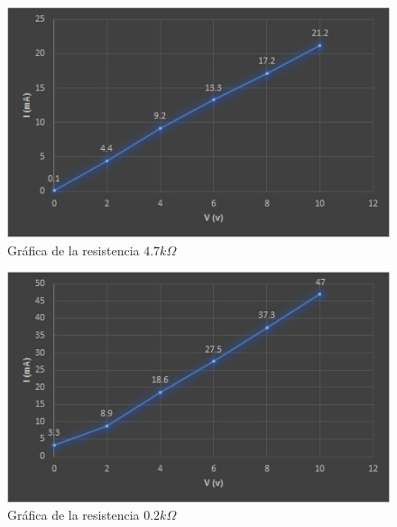 \begin{enumerate}
		\begin{figure}[h]
			\centering
			\includegraphics[scale=1]{imagenes/9.1}
			\caption{Gráfica de la resistencia $4.7k\Omega$}
		\end{figure}
		\begin{figure}[h]
			\centering
			\includegraphics[scale=1]{imagenes/9.2}
			\caption{Gráfica de la resistencia $0.2k\Omega$}
		\end{figure}
	

\end{enumerate}
